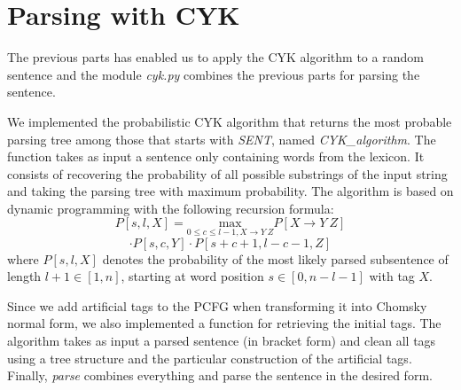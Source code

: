 \documentclass[10pt,twocolumn,letterpaper]{article}
\begin{document}
\section{Parsing with CYK}
The previous parts has enabled us to apply the CYK algorithm to a random sentence and the module \textit{cyk.py} combines the previous parts for parsing the sentence.\par
We implemented the probabilistic CYK algorithm that returns the most probable parsing tree among those that starts with \textit{SENT}, named \textit{CYK\_algorithm}. The function takes as input a sentence only containing words from the lexicon. It consists of recovering the probability of all possible substrings of the input string and taking the parsing tree with maximum probability. The algorithm is based on dynamic programming with the following recursion formula:\\
$$ P[s,l,X] = \underset{0 \leqslant c \leqslant l-1, X \rightarrow Y \: Z}{\text{max}} P[X \rightarrow Y \: Z] $$
$$\cdot P[s,c,Y] \cdot P[s + c + 1, l - c -1, Z]$$
where $P[s,l,X]$ denotes the probability of the most likely parsed subsentence of length $l + 1 \in [1,n]$, starting at word position $s \in [0, n-l-1]$ with tag $X$.\par
Since we add artificial tags to the PCFG when transforming it into Chomsky normal form, we also implemented a function for retrieving the initial tags. The algorithm takes as input  a parsed sentence (in bracket form) and clean all tags using a tree structure and the particular construction of the artificial tags. Finally, \textit{parse} combines everything and parse the sentence in the desired form.
\end{document}
